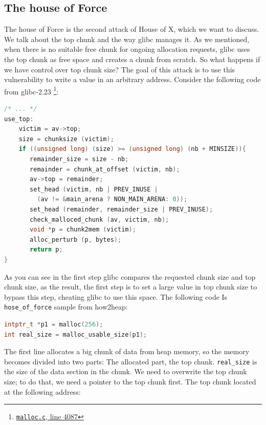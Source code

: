 \documentclass{masterthesis}
\newcommand*\libc{glibc}
\newcommand{\glnote}[1]{\todo[color=yellow!20]{#1}}
\begin{document}
\subsection{The house of Force}
\label{subsect:houseforce}
The house of Force is the second attack of House of X, which we want to discuss.\glnote{done-It comes after the House of Mind, though\ldots} We talk about the top chunk and the way \libc{} manages it. As we mentioned, when there is no suitable free chunk for ongoing allocation requests, \libc{} uses the top chunk as free space and creates a chunk from scratch. So what happens if we have control over top chunk size? The goal of this attack is to use this vulnerability to write a value in an arbitrary address. Consider the following code from \libc{-2.23} \footnote{\href{https://sourceware.org/git/?p=glibc.git;a=blob;f=malloc/malloc.c;h=f7cd29bc2f93e1082ee77800bd64a4b2a2897055;hb=9ea3686266dca3f004ba874745a4087a89682617\#l4087}{\texttt{malloc.c}, line 4087}}:
\begin{lstlisting}[language=c,frame=tlrb]
 /* ... */
use_top:
	victim = av->top;
	size = chunksize (victim);
	if ((unsigned long) (size) >= (unsigned long) (nb + MINSIZE)){
	   remainder_size = size - nb;
	   remainder = chunk_at_offset (victim, nb);
	   av->top = remainder;
	   set_head (victim, nb | PREV_INUSE |
	     (av != &main_arena ? NON_MAIN_ARENA: 0));
	   set_head (remainder, remainder_size | PREV_INUSE);
	   check_malloced_chunk (av, victim, nb);
	   void *p = chunk2mem (victim);
	   alloc_perturb (p, bytes);
	   return p;
}
\end{lstlisting}
As you can see in the first step \libc{} compares the requested chunk size and top chunk size, as the result, the first step is to set a large value in top chunk size to bypass this step, cheating \libc{} to use this space. The following code Is \lstinline{hose_of_force} sample from how2heap:

\begin{lstlisting}[language=c,frame=tlrb]
intptr_t *p1 = malloc(256);
int real_size = malloc_usable_size(p1);
\end{lstlisting}

The first line allocates a big chunk of data from heap memory, so the memory becomes divided into two parts: The allocated part, the top chunk. \lstinline{real_size} is the size of the data section in the chunk. We need to overwrite the top chunk size; to do that, we need a pointer to the top chunk first. The top chunk located at the following address:
\end{document}
